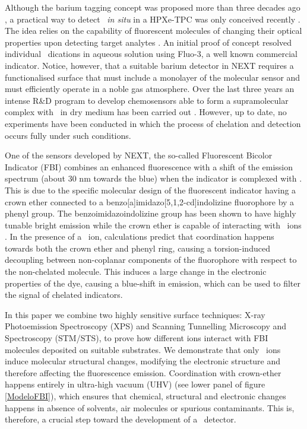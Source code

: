 \documentclass[aps,prl,reprint,longbibliography,superscriptaddress, english]{revtex4-1}
\begin{document}
Although the barium tagging concept was proposed more than three decades ago \cite{Moe:1991ik}, a practical way to detect \Bapp\ {\it in situ} in a HPXe-TPC was only conceived recently \cite{Nygren_2015, Jones:2016qiq}. The idea relies on the capability of fluorescent molecules of changing their optical properties upon detecting target analytes \cite{valeur_chemical,wolfbeis_materials_2005}. An initial proof of concept \cite{McDonald:2017izm} resolved individual \Bapp\ dications in aqueous solution using Fluo-3, a well known commercial indicator. Notice, however, that a suitable barium detector in NEXT requires a functionalised surface that must include a monolayer of the molecular sensor and must efficiently operate in a noble gas atmosphere. Over the last three years an intense R\&D program to develop chemosensors able to form a supramolecular complex with \Bapp\ in dry medium has been carried out \cite{Thapa:2019zjk, rivilla_fluorescent_2020,thapa_demonstration_2021}. However, up to date, no experiments have been conducted in which the process of chelation and detection occurs fully under such conditions.

One of the sensors developed by NEXT, the so-called
Fluorescent Bicolor Indicator (FBI) \cite{rivilla_fluorescent_2020} combines an enhanced fluorescence with a shift of the emission spectrum (about 30 nm towards the blue) when the indicator is complexed with \Bapp.  This is due to the specific molecular design of the fluorescent indicator having a crown ether connected to a benzo[a]imidazo[5,1,2-cd]indolizine fluorophore by a phenyl group. The benzoimidazoindolizine group has been shown to have highly tunable bright emission \cite{Stasyuk_benzo,Levesque_general} while the crown ether is capable of interacting with \Bapp\ ions \cite{valeur_chemical,maleknia_cavity-size-dependent_2002}. In the presence of a \Bapp\ ion, calculations predict that coordination happens towards both the crown ether and phenyl ring, causing a  {torsion-induced decoupling between non-coplanar components of the fluorophore with respect} to the non-chelated molecule. This induces a large change in the electronic properties of the dye, causing a blue-shift in emission, which can be used to filter the signal of chelated indicators.

In this paper we combine two highly sensitive surface techniques: X-ray Photoemission Spectroscopy (XPS) and Scanning Tunnelling Microscopy and Spectroscopy (STM/STS), to prove how different ions interact with FBI molecules deposited on suitable substrates. We demonstrate that only \Bapp\ ions induce molecular structural changes, modifying the electronic structure and therefore affecting the fluorescence emission. Coordination with crown-ether happens entirely in ultra-high vacuum (UHV) (see lower panel of figure {\ref{ModeloFBI}}), which ensures that chemical, structural and electronic changes happens in absence of solvents, air molecules or spurious contaminants. This is, therefore, a crucial step toward the development of a \Bapp\ detector. 
\end{document}
